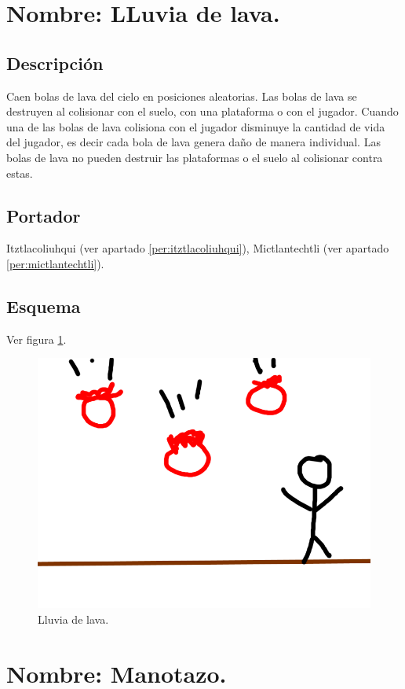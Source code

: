 \section{Nombre: LLuvia de lava.} \label{hab.LLuviaLava}
\subsection{Descripción}
Caen bolas de lava del cielo en posiciones aleatorias. Las bolas de lava se destruyen al colisionar con el suelo, con una plataforma o con el jugador. Cuando una de las bolas de lava colisiona con el jugador disminuye la cantidad de vida del jugador, es decir cada bola de lava genera daño de manera individual. Las bolas de lava no pueden destruir las plataformas o el suelo al colisionar contra estas.
\subsection{Portador}
Itztlacoliuhqui (ver apartado \ref{per:itztlacoliuhqui}), Mictlantechtli (ver apartado \ref{per:mictlantechtli}).	
\subsection{Esquema}	
			Ver figura \ref{fig:lluviaL}.
			\begin{figure}
				\centering
				\includegraphics[height=0.2 \textheight]{Imagenes/lluviaL}
				\caption{Lluvia de lava.}
				\label{fig:lluviaL}
			\end{figure}

\section{Nombre: Manotazo.} \label{hab.Manotazo}
